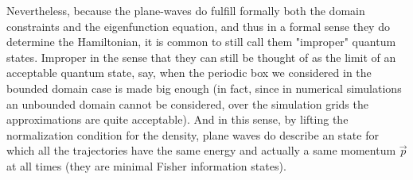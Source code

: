 \documentclass[11pt, a4paper]{article} %
\begin{document}
Nevertheless, because the plane-waves do fulfill formally both the domain constraints and the eigenfunction equation, and thus in a formal sense they do determine the Hamiltonian, it is common to still call them "improper" quantum states. Improper in the sense that they can still be thought of as the limit of an acceptable quantum state, say, when the periodic box we considered in the bounded domain case is made big enough (in fact, since in numerical simulations an unbounded domain cannot be considered, over the simulation grids the approximations are quite acceptable). And in this sense, by lifting the normalization condition for the density, plane waves do describe an state for which all the trajectories have the same energy and actually a same momentum $\vec{p}$ at all times (they are minimal Fisher information states).
\end{document}
